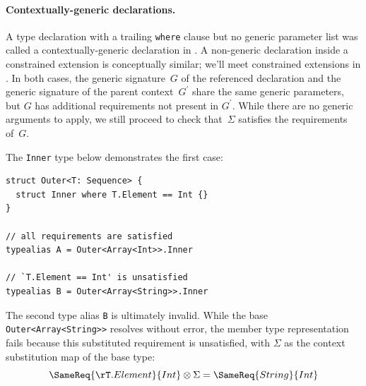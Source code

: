 \documentclass[../generics]{subfiles}
\begin{document}
\paragraph{Contextually-generic declarations.}
A type declaration with a trailing \texttt{where} clause but no generic parameter list was called a contextually-generic declaration in . A non-generic declaration inside a constrained extension is conceptually similar; we'll meet constrained extensions in . In both cases, the generic signature~$G$ of the referenced declaration and the generic signature of the parent context~$G^\prime$ share the same generic parameters, but $G$ has additional requirements not present in $G^\prime$. While there are no generic arguments to apply, we still proceed to check that~$\Sigma$ satisfies the requirements of~$G$.
\begin{example}
The \texttt{Inner} type below demonstrates the first case:
\begin{Verbatim}
struct Outer<T: Sequence> {
  struct Inner where T.Element == Int {}
}

// all requirements are satisfied
typealias A = Outer<Array<Int>>.Inner

// `T.Element == Int' is unsatisfied
typealias B = Outer<Array<String>>.Inner
\end{Verbatim}
The second type alias \texttt{B} is ultimately invalid. While the base \texttt{Outer<Array<String>>} resolves without error, the member type representation fails because this substituted requirement is unsatisfied, with $\Sigma$ as the context substitution map of the base type:
\[\SameReq{\rT.Element}{Int}\otimes\Sigma=\SameReq{String}{Int}\]
\end{example}
\end{document}
